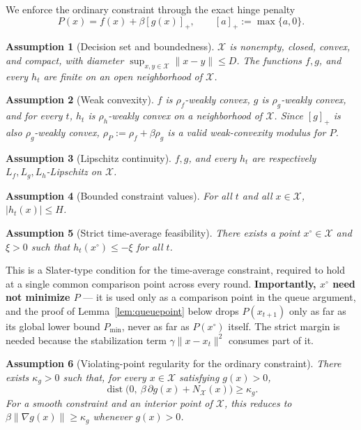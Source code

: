 \documentclass[10pt]{article}
\newtheorem{assumption}{Assumption}
\newcommand{\X}{\mathcal{X}}
\newcommand{\dist}{\mathop{\mathrm{dist}}}
\begin{document}
We enforce the ordinary constraint through the exact hinge penalty
\begin{equation}
P(x)=f(x)+\beta[g(x)]_+,
\qquad
[a]_+:=\max\{a,0\}.
\label{eq:P}
\end{equation}

\begin{assumption}[Decision set and boundedness]
\label{ass:compact}
$\X$ is nonempty, closed, convex, and compact, with diameter
$\sup_{x,y\in\X}\|x-y\|\leq D$. The functions $f,g$, and every $h_t$ are
finite on an open neighborhood of $\X$.
\end{assumption}

\begin{assumption}[Weak convexity]
\label{ass:weak}
$f$ is $\rho_f$-weakly convex, $g$ is $\rho_g$-weakly convex, and for
every $t$, $h_t$ is $\rho_h$-weakly convex on a neighborhood of $\X$.
Since $[g]_+$ is also $\rho_g$-weakly convex, $\rho_P:=\rho_f+\beta\rho_g$
is a valid weak-convexity modulus for $P$.
\end{assumption}

\begin{assumption}[Lipschitz continuity]
\label{ass:lipschitz}
$f,g$, and every $h_t$ are respectively $L_f,L_g,L_h$-Lipschitz on $\X$.
\end{assumption}

\begin{assumption}[Bounded constraint values]
\label{ass:boundedh}
For all $t$ and all $x\in\X$, $|h_t(x)|\leq H$.
\end{assumption}

\begin{assumption}[Strict time-average feasibility]
\label{ass:slater}
There exists a point $x^{\circ}\in\X$ and $\xi>0$ such that
$h_t(x^{\circ})\leq-\xi$ for all $t$.
\end{assumption}

This is a Slater-type condition for the time-average constraint, required
to hold at a single common comparison point across every round.
\textbf{Importantly, $x^{\circ}$ need not minimize $P$} --- it is used
only as a comparison point in the queue argument, and the proof of
Lemma~\ref{lem:queuepoint} below drops $P(x_{t+1})$ only as far as its
global lower bound $P_{\min}$, never as far as $P(x^{\circ})$ itself. The
strict margin is needed because the stabilization term
$\gamma\|x-x_t\|^2$ consumes part of it.

\begin{assumption}[Violating-point regularity for the ordinary constraint]
\label{ass:vp}
There exists $\kappa_g>0$ such that, for every $x\in\X$ satisfying
$g(x)>0$,
\[
\dist\bigl(0,\ \beta\,\partial g(x)+N_{\X}(x)\bigr)\geq\kappa_g.
\]
For a smooth constraint and an interior point of $\X$, this reduces to
$\beta\|\nabla g(x)\|\geq\kappa_g$ whenever $g(x)>0$.
\end{assumption}
\end{document}
